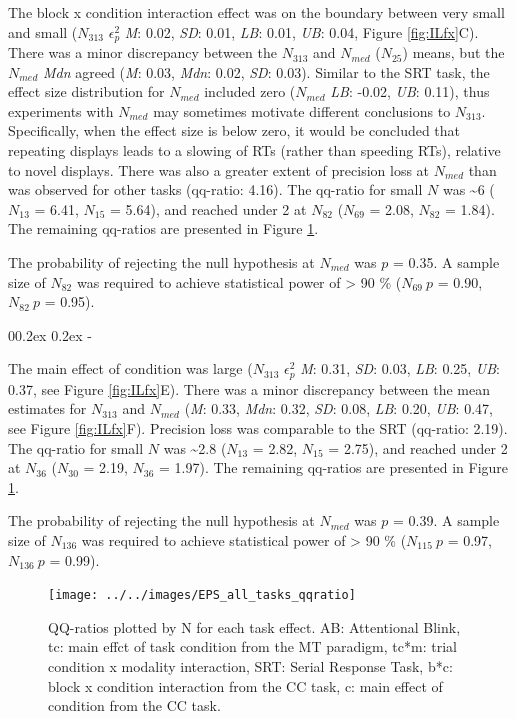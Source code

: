 \documentclass[
  man]{apa6}
\makeatletter
\let\oldsubparagraph\subparagraph
\renewcommand{\subparagraph}[1]{\oldsubparagraph{#1}\mbox{}}
\renewcommand{\subparagraph}[1]{\@startsection{subparagraph}{5}{1em}%
  {0\baselineskip \@plus 0.2ex \@minus 0.2ex}%
  {-\z@\relax}%
  {\normalfont\normalsize\itshape\hspace{\parindent}{#1}\textit{\addperi}}{\relax}}
\makeatother
\begin{document}
The block x condition interaction effect was on the boundary between very small and small (\(N_{313}\) \(\epsilon_{p}^2\) \emph{M}: 0.02, \emph{SD}: 0.01, \emph{LB}: 0.01, \emph{UB}: 0.04, Figure \ref{fig:ILfx}C). There was a minor discrepancy between the \(N_{313}\) and \(N_{med}\) (\(N_{25}\)) means, but the \(N_{med}\) \emph{Mdn} agreed (\emph{M}: 0.03, \emph{Mdn}: 0.02, \emph{SD}: 0.03). Similar to the SRT task, the effect size distribution for \(N_{med}\) included zero (\(N_{med}\) \emph{LB}: -0.02, \emph{UB}: 0.11), thus experiments with \(N_{med}\) may sometimes motivate different conclusions to \(N_{313}\). Specifically, when the effect size is below zero, it would be concluded that repeating displays leads to a slowing of RTs (rather than speeding RTs), relative to novel displays. There was also a greater extent of precision loss at \(N_{med}\) than was observed for other tasks (qq-ratio: 4.16). The qq-ratio for small \(N\) was \textasciitilde6 (\(N_{13}\) = 6.41, \(N_{15}\) = 5.64), and reached under 2 at \(N_{82}\) (\(N_{69}\) = 2.08, \(N_{82}\) = 1.84). The remaining qq-ratios are presented in Figure \ref{fig:fxqq}.

The probability of rejecting the null hypothesis at \(N_{med}\) was \(p\) = 0.35. A sample size of \(N_{82}\) was required to achieve statistical power of \textgreater{} 90 \% (\(N_{69}\ p\) = 0.90, \(N_{82}\ p\) = 0.95).

\hypertarget{main-effect-of-condition}{%
\subparagraph{Main Effect of Condition}\label{main-effect-of-condition}}

The main effect of condition was large (\(N_{313}\) \(\epsilon_{p}^2\) \emph{M}: 0.31, \emph{SD}: 0.03, \emph{LB}: 0.25, \emph{UB}: 0.37, see Figure \ref{fig:ILfx}E). There was a minor discrepancy between the mean estimates for \(N_{313}\) and \(N_{med}\) (\emph{M}: 0.33, \emph{Mdn}: 0.32, \emph{SD}: 0.08, \emph{LB}: 0.20, \emph{UB}: 0.47, see Figure \ref{fig:ILfx}F). Precision loss was comparable to the SRT (qq-ratio: 2.19). The qq-ratio for small \(N\) was \textasciitilde2.8 (\(N_{13}\) = 2.82, \(N_{15}\) = 2.75), and reached under 2 at \(N_{36}\) (\(N_{30}\) = 2.19, \(N_{36}\) = 1.97). The remaining qq-ratios are presented in Figure \ref{fig:fxqq}.

The probability of rejecting the null hypothesis at \(N_{med}\) was \(p\) = 0.39. A sample size of \(N_{136}\) was required to achieve statistical power of \textgreater{} 90 \% (\(N_{115}\ p\) = 0.97, \(N_{136}\ p\) = 0.99).

\begin{figure}

{\centering \texttt{[image: ../../images/EPS\_all\_tasks\_qqratio]} 

}

\caption{QQ-ratios plotted by N for each task effect. AB: Attentional Blink, tc: main effct of task condition from the MT paradigm, tc*m: trial condition x modality interaction, SRT: Serial Response Task, b*c: block x condition interaction from the CC task, c: main effect of condition from the CC task.}\label{fig:fxqq}
\end{figure}
\end{document}
